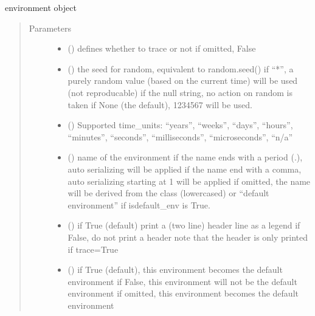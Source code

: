 \documentclass[letterpaper,10pt,english]{sphinxmanual}
\begin{document}
\begin{fulllineitems}
\label{\detokenize{Reference:salabim.Environment}}
environment object
\begin{quote}\begin{description}
\item[{Parameters}] \leavevmode\begin{itemize}
\item {} 
 () \textendash{} defines whether to trace or not 
if omitted, False

\item {} 
 (\sphinxstyleliteralemphasis{, }) \textendash{} the seed for random, equivalent to random.seed() 
if “*”, a purely random value (based on the current time) will be used
(not reproducable) 
if the null string, no action on random is taken 
if None (the default), 1234567 will be used.

\item {} 
 () \textendash{} Supported time\_units: 
“years”, “weeks”, “days”, “hours”, “minutes”, “seconds”, “milliseconds”, “microseconds”, “n/a”

\item {} 
 () \textendash{} name of the environment 
if the name ends with a period (.),
auto serializing will be applied 
if the name end with a comma,
auto serializing starting at 1 will be applied 
if omitted, the name will be derived from the class (lowercased)
or “default environment” if isdefault\_env is True.

\item {} 
 () \textendash{} if True (default) print a (two line) header line as a legend 
if False, do not print a header 
note that the header is only printed if trace=True

\item {} 
 () \textendash{} if True (default), this environment becomes the default environment 
if False, this environment will not be the default environment 
if omitted, this environment becomes the default environment 


\end{itemize}
\end{description}
\end{quote}
\end{fulllineitems}
\end{document}
